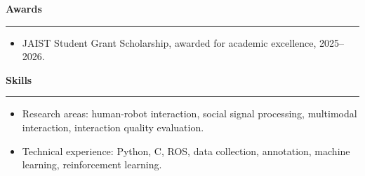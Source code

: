 \documentclass[10pt,a4paper]{article}
\newcommand{\cvsection}[1]{%
  \vspace{6pt}
  {\large\bfseries #1}\\[-2pt]
  \rule{\textwidth}{0.4pt}
  \vspace{2pt}
}
\begin{document}
\cvsection{Awards}
\begin{itemize}
  \item JAIST Student Grant Scholarship, awarded for academic excellence, 2025--2026.
\end{itemize}

\cvsection{Skills}
\begin{itemize}
  \item Research areas: human-robot interaction, social signal processing, multimodal interaction, interaction quality evaluation.
  \item Technical experience: Python, C, ROS, data collection, annotation, machine learning, reinforcement learning.
\end{itemize}
\end{document}
